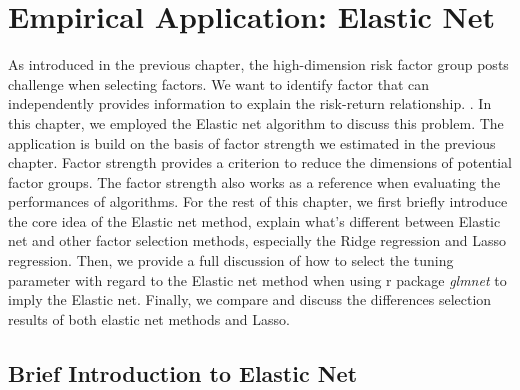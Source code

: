 \chapter{Empirical Application: Elastic Net}\label{Empirical:Elastic_net}
As introduced in the previous chapter, the high-dimension risk factor group posts challenge when selecting factors.
We want to identify factor that can independently provides information to explain the risk-return relationship. \cite{Cochrane2011}.
In this chapter, we employed the Elastic net algorithm to discuss this problem.
The application is build on the basis of factor strength we estimated in the previous chapter.
Factor strength provides a criterion to reduce the dimensions of potential factor groups.
The factor strength also works as a reference when evaluating the performances of algorithms.
For the rest of this chapter, we first briefly introduce the core idea of the Elastic net method, explain what's different between Elastic net and other factor selection methods, especially the Ridge regression and Lasso regression.
Then, we provide a full discussion of how to select the tuning parameter with regard to the Elastic net method when using r package \textit{glmnet} to imply the Elastic net.
Finally, we compare and discuss the differences selection results of both elastic net methods and Lasso.


\section{Brief Introduction to Elastic Net} \label{Elastic_Net}

